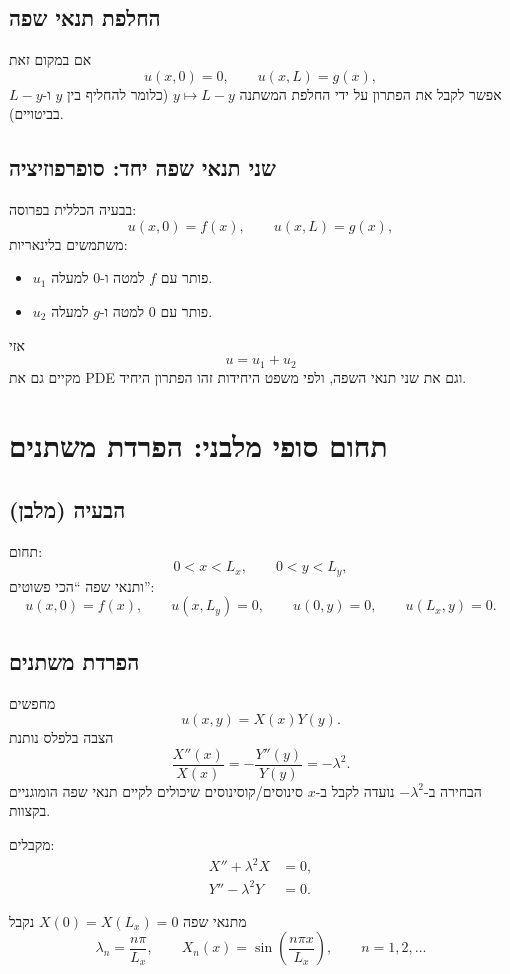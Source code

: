 \subsection{החלפת תנאי שפה}
אם במקום זאת
\[
u(x,0)=0,\qquad u(x,L)=g(x),
\]
אפשר לקבל את הפתרון על ידי החלפת המשתנה $y\mapsto L-y$ (כלומר להחליף בין $y$ ו-$L-y$ בביטויים).

\subsection{שני תנאי שפה יחד: סופרפוזיציה}
בבעיה הכללית בפרוסה:
\[
u(x,0)=f(x),\qquad u(x,L)=g(x),
\]
משתמשים בלינאריות:
\begin{itemize}
  \item $u_1$ פותר עם $f$ למטה ו-$0$ למעלה.
  \item $u_2$ פותר עם $0$ למטה ו-$g$ למעלה.
\end{itemize}
אזי
\begin{equation}
u=u_1+u_2
\end{equation}
מקיים גם את PDE וגם את שני תנאי השפה, ולפי משפט היחידות זהו הפתרון היחיד.

\section{תחום סופי מלבני: הפרדת משתנים}
\subsection{הבעיה (מלבן)}
תחום:
\[
0<x<L_x,\qquad 0<y<L_y,
\]
ותנאי שפה ``הכי פשוטים'':
\begin{equation}
u(x,0)=f(x),\qquad
u(x,L_y)=0,\qquad
u(0,y)=0,\qquad
u(L_x,y)=0.
\end{equation}

\subsection{הפרדת משתנים}
מחפשים
\[
u(x,y)=X(x)Y(y).
\]
הצבה בלפלס נותנת
\[
\frac{X''(x)}{X(x)}=-\frac{Y''(y)}{Y(y)}=-\lambda^2.
\]
הבחירה ב-$-\lambda^2$ נועדה לקבל ב-$x$ סינוסים/קוסינוסים שיכולים לקיים תנאי שפה הומוגניים בקצוות.

מקבלים:
\begin{align}
X''+\lambda^2X&=0,\\
Y''-\lambda^2Y&=0.
\end{align}

מתנאי שפה $X(0)=X(L_x)=0$ נקבל
\begin{equation}
\lambda_n=\frac{n\pi}{L_x},\qquad X_n(x)=\sin\left(\frac{n\pi x}{L_x}\right),\qquad n=1,2,\dots
\end{equation}


